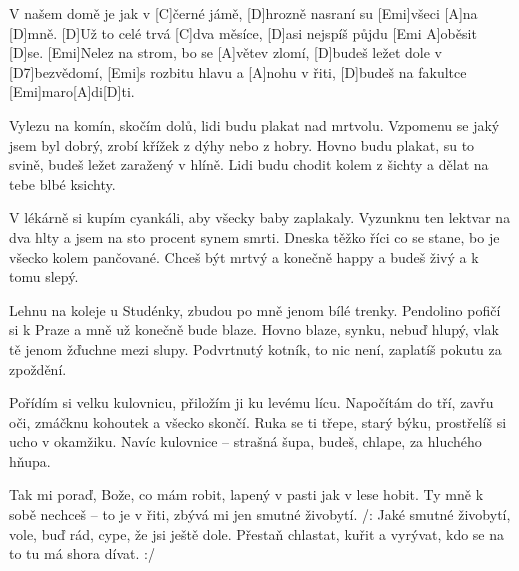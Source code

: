 
\sloka
[D]V našem domě je jak v [C]černé jámě,
[D]hrozně nasraní su [Emi]všeci [A]na [D]mně.
[D]Už to celé trvá [C]dva měsíce,
[D]asi nejspíš půjdu [Emi A]oběsit [D]se.
[Emi]Nelez na strom, bo se [A]větev zlomí,
[D]budeš ležet dole v [D7]bezvědomí,
[Emi]s rozbitu hlavu a [A]nohu v řiti,
[D]budeš na fakultce [Emi]maro[A]di[D]ti.

\sloka
Vylezu na komín, skočím dolů, lidi budu plakat nad mrtvolu.
Vzpomenu se jaký jsem byl dobrý, zrobí křížek z dýhy nebo z hobry.
Hovno budu plakat, su to svině, budeš ležet zaražený v hlíně.
Lidi budu chodit kolem z šichty a dělat na tebe blbé ksichty.

\sloka
V lékárně si kupím cyankáli, aby všecky baby zaplakaly.
Vyzunknu ten lektvar na dva hlty a jsem na sto procent synem smrti.
Dneska těžko říci co se stane, bo je všecko kolem pančované.
Chceš být mrtvý a konečně happy a budeš živý a k tomu slepý.

\sloka
Lehnu na koleje u Studénky, zbudou po mně jenom bílé trenky.
Pendolino pofičí si k Praze a mně už konečně bude blaze.
Hovno blaze, synku, nebuď hlupý, vlak tě jenom žďuchne mezi slupy.
Podvrtnutý kotník, to nic není, zaplatíš pokutu za zpoždění.

\sloka
Pořídím si velku kulovnicu, přiložím ji ku levému lícu.
Napočítám do tří, zavřu oči, zmáčknu kohoutek a všecko skončí.
Ruka se ti třepe, starý býku, prostřelíš si ucho v okamžiku.
Navíc kulovnice – strašná šupa, budeš, chlape, za hluchého hňupa.

\sloka
Tak mi poraď, Bože, co mám robit, lapený v pasti jak v lese hobit.
Ty mně k sobě nechceš – to je v řiti, zbývá mi jen smutné živobytí.
/: Jaké smutné živobytí, vole, buď rád, cype, že jsi ještě dole.
Přestaň chlastat, kuřit a vyrývat, kdo se na to tu má shora dívat. :/
